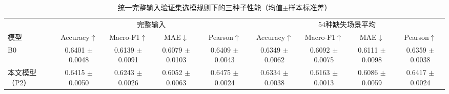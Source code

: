 \begin{table}[htbp]
\centering
\caption{统一完整输入验证集选模规则下的三种子性能（均值$\pm$样本标准差）}
\label{tab:q2_cleanselect_fair_comparison}
\footnotesize
\setlength{\tabcolsep}{2.5pt}
\renewcommand{\arraystretch}{1.2}
\begin{tabular}{lcccccccc}
\toprule
& \multicolumn{4}{c}{完整输入} & \multicolumn{4}{c}{54种缺失场景平均} \\
\cmidrule(lr){2-5}\cmidrule(lr){6-9}
模型 & Accuracy$\uparrow$ & Macro-F1$\uparrow$ & MAE$\downarrow$ & Pearson$\uparrow$ & Accuracy$\uparrow$ & Macro-F1$\uparrow$ & MAE$\downarrow$ & Pearson$\uparrow$ \\
\midrule
B0 & \shortstack[c]{0.6401 \\ $\pm$ 0.0048} & \shortstack[c]{0.6139 \\ $\pm$ 0.0091} & \shortstack[c]{0.6079 \\ $\pm$ 0.0103} & \shortstack[c]{0.6409 \\ $\pm$ 0.0043} & \shortstack[c]{0.6349 \\ $\pm$ 0.0062} & \shortstack[c]{0.6092 \\ $\pm$ 0.0075} & \shortstack[c]{0.6111 \\ $\pm$ 0.0098} & \shortstack[c]{0.6359 \\ $\pm$ 0.0038} \\
\addlinespace[2pt]
本文模型（P2） & \shortstack[c]{0.6415 \\ $\pm$ 0.0050} & \shortstack[c]{0.6243 \\ $\pm$ 0.0026} & \shortstack[c]{0.6052 \\ $\pm$ 0.0063} & \shortstack[c]{0.6475 \\ $\pm$ 0.0024} & \shortstack[c]{0.6334 \\ $\pm$ 0.0038} & \shortstack[c]{0.6163 \\ $\pm$ 0.0013} & \shortstack[c]{0.6086 \\ $\pm$ 0.0059} & \shortstack[c]{0.6417 \\ $\pm$ 0.0024} \\
\bottomrule
\end{tabular}
\end{table}

